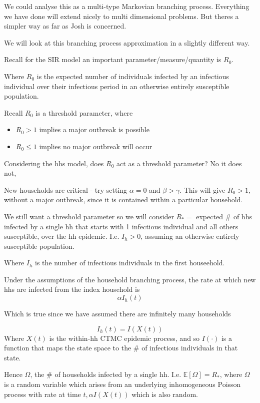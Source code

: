 \documentclass{X:/Documents/Coding/Latex/myassignment}
\begin{document}
We could analyse this as a multi-type Markovian branching process. Everything we have done will extend nicely to multi dimensional problems. But theres a simpler way as far as Josh is concerned.

We will look at this branching process approximation in a slightly different way. 



Recall for the SIR model an important parameter/measure/quantity is $R_0$. 

Where $R_0$ is the expected number of individuals infected by an infectious individual over their infectious period in an otherwise entirely susceptible population.

Recall $R_0$ is a threshold parameter, where
\begin{itemize}
    \item $R_0 >1$ implies a major outbreak is possible
    \item $R_0 \leq 1$ implies no major outbreak will occur 
\end{itemize}


Considering the hhs model, does $R_0$ act as a threshold parameter?
No it does not, 

New households are critical - try setting $\alpha = 0$ and $\beta > \gamma$. This will give $R_0 > 1$, without a major outbreak, since it is contained within a particular household.

We still want a threshold parameter so we will consider
$R_* =$ expected \# of hhs infected by a single hh that starts with 1 infectious individual and all others susceptible, over the hh epidemic. I.e. $I_h > 0$, assuming an otherwise entirely susceptible population.

Where $I_h$ is the number of infectious individuals in the first houseehold.

Under the assumptions of the household branching process, the rate at which new hhs are infected from the index household is
\[\alpha I_h(t)\]

Which is true since we have assumed there are infinitely many households


\[I_h(t) = I(X(t))\]
Where $X(t)$ is the within-hh CTMC epidemic process, and so $I(\cdot)$ is a function that maps the state space to the $\#$ of infectious individuals in that state.

Hence $\Omega$, the $\#$ of households infected by a single hh. I.e. $\mathbb{E}\left[\Omega\right] = R_*$, where $\Omega$ is a random variable which arises from an underlying inhomogeneous Poisson process with rate at time $t, \alpha I(X(t))$ which is also random.
\end{document}
